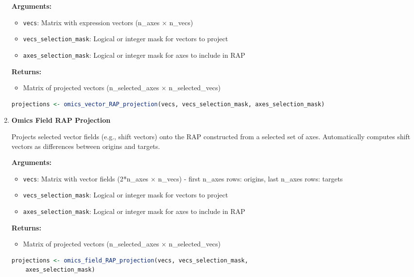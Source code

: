 \begin{enumerate}
    \textbf{Arguments:}
    \begin{itemize}
        \item \texttt{vecs}: Matrix with expression vectors (n\_axes × n\_vecs)
        \item \texttt{vecs\_selection\_mask}: Logical or integer mask for vectors to project
        \item \texttt{axes\_selection\_mask}: Logical or integer mask for axes to include in RAP
    \end{itemize}
    \textbf{Returns:}
    \begin{itemize}
        \item Matrix of projected vectors (n\_selected\_axes × n\_selected\_vecs)
    \end{itemize}
\begin{lstlisting}[language=R, caption={Vector RAP Projection}]
projections <- omics_vector_RAP_projection(vecs, vecs_selection_mask, axes_selection_mask)
\end{lstlisting}

    \item \textbf{Omics Field RAP Projection}

    Projects selected vector fields (e.g., shift vectors) onto the RAP constructed from a selected set of axes. Automatically computes shift vectors as differences between origins and targets.
    
    \textbf{Arguments:}
    \begin{itemize}
        \item \texttt{vecs}: Matrix with vector fields (2*n\_axes × n\_vecs) - first n\_axes rows: origins, last n\_axes rows: targets
        \item \texttt{vecs\_selection\_mask}: Logical or integer mask for vectors to project
        \item \texttt{axes\_selection\_mask}: Logical or integer mask for axes to include in RAP
    \end{itemize}
    \textbf{Returns:}
    \begin{itemize}
        \item Matrix of projected vectors (n\_selected\_axes × n\_selected\_vecs)
    \end{itemize}
\begin{lstlisting}[language=R, caption={Vector Field RAP Projection}]
projections <- omics_field_RAP_projection(vecs, vecs_selection_mask, 
    axes_selection_mask)
\end{lstlisting}

\end{enumerate}
